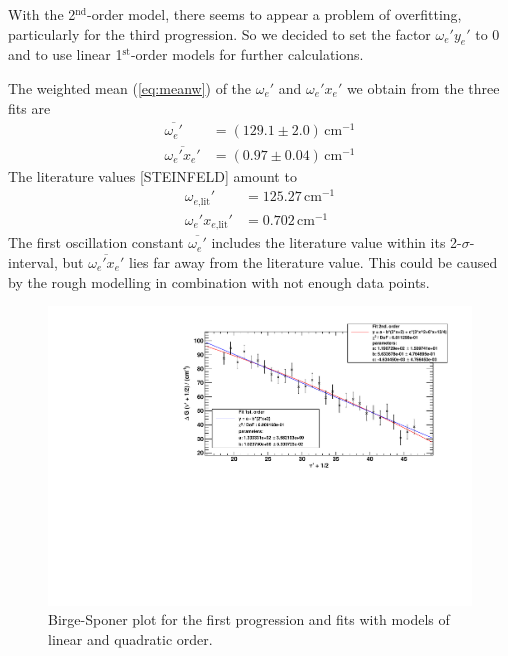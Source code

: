 With the 2$^\text{nd}$-order model, there seems to appear a problem of overfitting,
particularly for the third progression.
So we decided to set the factor $\omega_e' y_e'$ to 0 and to use linear 1$^\text{st}$-order models
for further calculations.

The weighted mean (\autoref{eq:meanw}) of the $\omega_e'$ and $\omega_e' x_e'$ we obtain from the three fits are
\begin{equation}
\begin{split}
    \overline{\omega_e'}		&   = (129.1 \pm 2.0)\,\text{cm}^{-1}\\
    \overline{\omega_e' x_e'} 	&	= (0.97 \pm 0.04)\,\text{cm}^{-1}
  \end{split}
\end{equation}
The literature values [STEINFELD] amount to %
\begin{equation}
\begin{split}
    \omega_{e\text{,lit}}'			&   = 125.27\,\text{cm}^{-1}\\
    \omega_e' x_{e\text{,lit}}' 	&	= 0.702\,\text{cm}^{-1}
  \end{split}
\end{equation}
The first oscillation constant $\overline{\omega_e'}$ includes the literature value within its 2-$\sigma$-interval, but
$\overline{\omega_e' x_e'}$ lies far away from the literature value. This could be caused by the rough
modelling in combination with not enough data points.



\begin{figure}[H]
\begin{center}
  \includegraphics[width=\textwidth]{../img/prog1_birgesponer.pdf}
  \caption[---]{Birge-Sponer plot for the first progression and fits with models of linear and quadratic order.}
  \label{img:prog1}
\end{center}
\end{figure}


